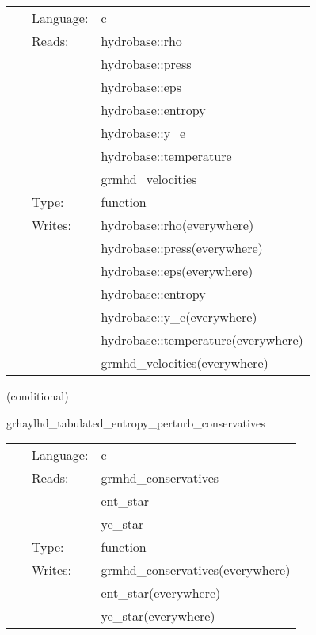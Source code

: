  \begin{tabular*}{160mm}{cll} 
~ & Language:  & c \\ 
~ & Reads:  & hydrobase::rho \\ 
~& ~ &hydrobase::press\\ 
~& ~ &hydrobase::eps\\ 
~& ~ &hydrobase::entropy\\ 
~& ~ &hydrobase::y\_e\\ 
~& ~ &hydrobase::temperature\\ 
~& ~ &grmhd\_velocities\\ 
~ & Type:  & function \\ 
~ & Writes:  & hydrobase::rho(everywhere) \\ 
~& ~ &hydrobase::press(everywhere)\\ 
~& ~ &hydrobase::eps(everywhere)\\ 
~& ~ &hydrobase::entropy\\ 
~& ~ &hydrobase::y\_e(everywhere)\\ 
~& ~ &hydrobase::temperature(everywhere)\\ 
~& ~ &grmhd\_velocities(everywhere)\\ 
\end{tabular*} 


\vspace{5mm}

   (conditional) 

\hspace{5mm} grhaylhd\_tabulated\_entropy\_perturb\_conservatives 

\hspace{5mm}{\it entropy+tabulated version of grhaylhd\_perturb\_conservatives } 


\hspace{5mm}

 \begin{tabular*}{160mm}{cll} 
~ & Language:  & c \\ 
~ & Reads:  & grmhd\_conservatives \\ 
~& ~ &ent\_star\\ 
~& ~ &ye\_star\\ 
~ & Type:  & function \\ 
~ & Writes:  & grmhd\_conservatives(everywhere) \\ 
~& ~ &ent\_star(everywhere)\\ 
~& ~ &ye\_star(everywhere)\\ 
\end{tabular*} 


